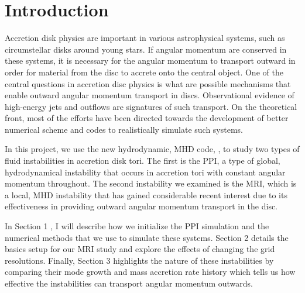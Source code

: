 \documentclass[iop,revtex4]{emulateapj}
\begin{document}
\section{Introduction}\label{sec:intro}
\par Accretion disk physics are important in various astrophysical systems, such as circumstellar disks around young stars.  If angular momentum are conserved in these systems, it is necessary for the angular momentum to transport outward in order for material from the disc to accrete onto the central object. One of the central questions in accretion disc physics is what are possible mechanisms that enable outward angular momentum transport in discs. Observational evidence of high-energy jets and outflows are signatures of such transport. On the theoretical front, most of the efforts have been directed towards the development of better numerical scheme and codes to realistically simulate such systems. 
\par In this project, we use the new hydrodynamic, \ac{MHD} code, \app, to study two types of fluid instabilities in accretion disk tori. The first is the \ac{PPI}, a type of global, hydrodynamical instability that occurs in accretion tori with constant angular momentum throughout. The second instability we examined is the \ac{MRI}, which is a local, \ac{MHD} instability that has gained considerable recent interest due to its effectiveness in providing outward angular momentum transport in the disc.
\par In Section 1%
, I will describe how we initialize the \ac{PPI} simulation and the numerical methods that we use to simulate these systems. Section 2%
details the basics setup for our \ac{MRI} study and explore the effects of changing the grid resolutions. Finally, Section 3%
highlights the nature of these instabilities by comparing their mode growth and mass accretion rate history which tells us how effective the instabilities can transport angular momentum outwards.
\end{document}
